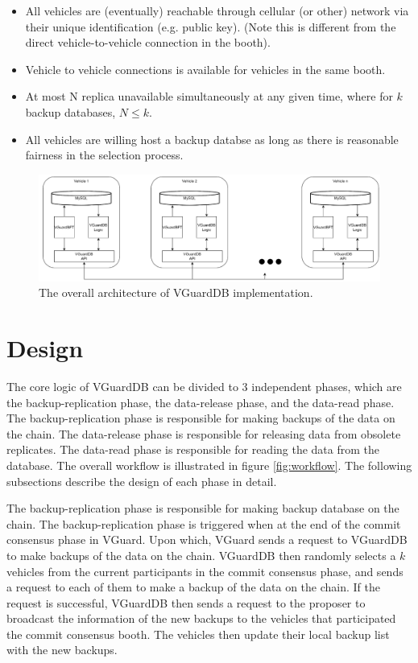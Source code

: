 \begin{itemize}
    \item All vehicles are (eventually) reachable through cellular (or other) network via their unique identification (e.g. public key). (Note this is different from the direct vehicle-to-vehicle connection in the booth).
    \item 
    Vehicle to vehicle connections is available for vehicles in the same booth.
    \item
    At most N replica unavailable simultaneously at any given time, where for $k$ backup databases, $N \leq k$.
    \item
    All vehicles are willing host a backup databse as long as there is reasonable fairness in the selection process.

\end{itemize}
\begin{figure}[t]
    \centering
    \includegraphics[width=\textwidth]{img/architecture.png}
    \caption{The overall architecture of VGuardDB implementation.}
    \label{fig:architecture}
\end{figure}
\section{Design}
The core logic of VGuardDB can be divided to 3 independent phases, which are the backup-replication phase, the data-release phase, and the data-read phase. The backup-replication phase is responsible for making backups of the data on the chain. The data-release phase is responsible for releasing data from obsolete replicates. The data-read phase is responsible for reading the data from the database. The overall workflow is illustrated in figure \ref{fig:workflow}. The following subsections describe the design of each phase in detail.

The backup-replication phase is responsible for making backup database on the chain. The backup-replication phase is triggered when at the end of the commit consensus phase in VGuard. Upon which, VGuard sends a request to VGuardDB to make backups of the data on the chain. VGuardDB then randomly selects a $k$ vehicles from the current participants in the commit consensus phase, and sends a request to each of them to make a backup of the data on the chain. If the request is successful, VGuardDB then sends a request to the proposer to broadcast the information of the new backups to the vehicles that participated the commit consensus booth. The vehicles then update their local backup list with the new backups.

